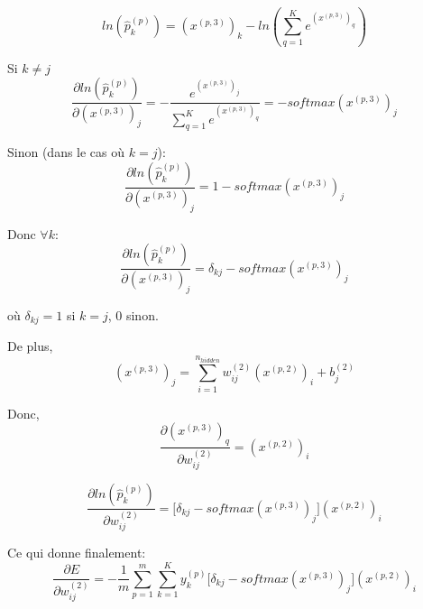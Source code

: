 \documentclass[a4paper,11pt,oneside,roman]{article}
\begin{document}
    \begin{equation}
        \nonumber
        ln(\hat{p}_{k}^{(p)})  = (x^{(p,3)})_k - ln(\sum\limits_{q=1}^{K} e^{(x^{(p,3)})_q})
    \end{equation}

    Si $k \ne j$
    \begin{equation}
        \nonumber
        \frac{\partial ln(\hat{p}_{k}^{(p)})}{\partial (x^{(p,3)})_{j}} = -\frac{e^{(x^{(p,3)})_j}}{\sum\limits_{q=1}^{K} e^{(x^{(p,3)})_q}} = -softmax(x^{(p,3)})_j
    \end{equation}

    Sinon (dans le cas où $k = j$):
    \begin{equation}
        \nonumber
        \frac{\partial ln(\hat{p}_{k}^{(p)})}{\partial (x^{(p,3)})_{j}} = 1 - softmax(x^{(p,3)})_j
    \end{equation}

    Donc $\forall k$:
    \begin{equation}
        \frac{\partial ln(\hat{p}_{k}^{(p)})}{\partial (x^{(p,3)})_{j}} = \delta_{kj} - softmax(x^{(p,3)})_j
        \label{log_x3}
    \end{equation}
    
    où $ \delta_{kj} = 1$ si $k = j$, $0$ sinon.
    
    De plus,
    \begin{equation}
        \nonumber
        (x^{(p,3)})_{j} = \sum\limits_{i=1}^{n_{hidden}} w_{ij}^{(2)}(x^{(p,2)})_i + b_j^{(2)}
    \end{equation}

    Donc,
    \begin{equation}
        \nonumber
        \frac{\partial (x^{(p,3)})_{q}}{\partial w^{(2)}_{ij}} = (x^{(p,2)})_i
    \end{equation}

    \begin{equation}
        \nonumber
        \frac{\partial ln(\hat{p}_{k}^{(p)})}{\partial w^{(2)}_{ij}} = \bigg[ \delta_{kj} - softmax(x^{(p,3)})_j \bigg] (x^{(p,2)})_{i}
    \end{equation}

    Ce qui donne finalement:
    \begin{equation}
        \nonumber
        \frac{\partial E}{\partial w_{ij}^{(2)}} = -\frac{1}{m} \sum\limits_{p=1}^{m} \sum\limits_{k=1}^{K} y_k^{(p)} \bigg[ \delta_{kj} - softmax(x^{(p,3)})_j \bigg] (x^{(p,2)})_{i}
    \end{equation}
\end{document}
